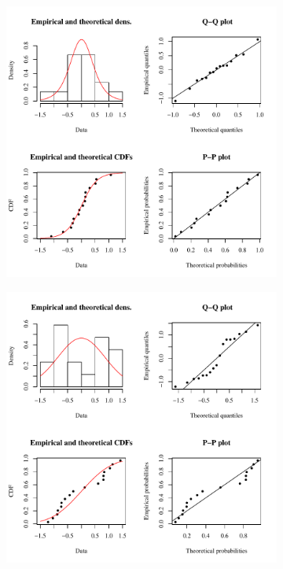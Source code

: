 \subfiguretop
\begin{landscape}
	\begin{figure}
		\begin{subfigure}{0.7\textwidth}
			\centering
			\includegraphics[width=\tableCustomSize]{"Figures/Results_USR/Stochastic/Conc Model res-fit U163"}
		\end{subfigure}%
		\begin{subfigure}{0.7\textwidth}
			\centering
			\includegraphics[width=\tableCustomSize]{"Figures/Results_USR/Stochastic/Conc Model res-fit U201"}

\end{subfigure}
\end{figure}
\end{landscape}
